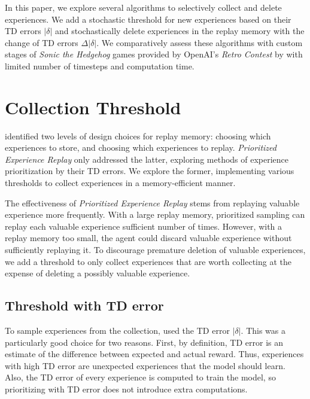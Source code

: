\documentclass{article} %
\begin{document}
In this paper, we explore several algorithms to selectively collect and delete experiences.  We add a stochastic threshold for new experiences based on their TD errors $\lvert \delta \rvert$ and stochastically delete experiences in the replay memory with the change of TD errors $\Delta \lvert \delta \rvert$. We comparatively assess these algorithms with custom stages of \textit{Sonic the Hedgehog} games provided by OpenAI's \textit{Retro Contest} by \cite{Retro} with limited number of timesteps and computation time.




\section{Collection Threshold}
\cite{PER} identified two levels of design choices for replay memory: choosing  which experiences to store, and choosing which experiences to replay. \textit{Prioritized Experience Replay} only addressed the latter, exploring methods of experience prioritization by their TD errors. We explore the former, implementing various thresholds to collect experiences in a memory-efficient manner.

The effectiveness of \textit{Prioritized Experience Replay} stems from replaying valuable experience more frequently. With a large replay memory, prioritized sampling can replay each valuable experience sufficient number of times. However, with a replay memory too small, the agent could discard valuable experience without sufficiently replaying it. To discourage premature deletion of valuable experiences, we add a threshold to only collect experiences that are worth collecting at the expense of deleting a possibly valuable experience.

\subsection{Threshold with TD error}
To sample experiences from the collection, \cite{PER} used the TD error $\lvert \delta \rvert$. This was a particularly good choice for two reasons. First, by definition, TD error is an estimate of the difference between expected and actual reward. Thus, experiences with high TD error are unexpected experiences that the model should learn. Also, the TD error of every experience is computed to train the model, so prioritizing with TD error does not introduce extra computations.
\end{document}
